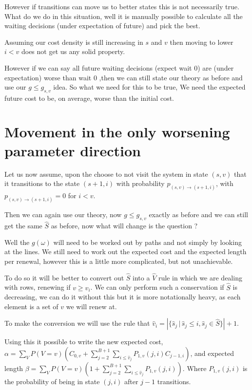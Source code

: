 \documentclass[a4paper,10pt]{article}
\theoremstyle{definition}
\theoremstyle{definition}
\theoremstyle{remark}
\theoremstyle{definition}
\begin{document}
However if transitions can move us to better states this is not necessarily true. What do we do in this situation, well it is manually possible to calculate all the waiting decisions (under expectation of future) and pick the best.

Assuming our cost density is still increasing in $s$ and $v$ then moving to lower $i < v$ does not get us any solid property.

However if we can say all future waiting decisions (expect wait 0) are (under expectation) worse than wait 0 ,then we can still state our theory as before and use our $g \leq g_{s,v}$ idea. So what we need for this to be true, We need the expected future cost to be, on average, worse than the initial cost.

\section{Movement in the only worsening parameter direction}

Let us now assume, upon the choose to not visit the system in state $(s,v)$ that it transitions to the state $(s+1,i)$ with probability $p_{(s,v) \rightarrow (s+1,i)}$, with $p_{(s,v) \rightarrow (s+1,i)}=0$ for $i < v$.

Then we can again use our theory, now $g \leq g_{s,v}$ exactly as before and we can still get the same $\hat{S}$ as before, now what will change is the question ?

Well the $g(\omega)$ will need to be worked out by paths and not simply by looking at the lines. We still need to work out the expected cost and the expected length per renewal, however this is a little more complicated, but not unachievable.

To do so it will be better to convert out $\hat{S}$ into a $\hat{V}$ rule in which we are dealing with rows, renewing if $v \geq \hat{v}_{i}$. We can only perform such a conservation if $\hat{S}$ is decreasing, we can do it without this but it is more notationally heavy, as each element is a set of $v$ we will renew at.

To make the conversion we will use the rule that $\hat{v}_{i}= \left| \{ \hat{s}_{j} \, | \, \hat{s}_{j} \leq i , \hat{s}_{j} \in \hat{S} \}\right|+1$.

Using this it possible to write the new expected cost, $\alpha=\sum\limits_{V} P(V=v) (C_{0,v}+ \sum\limits_{j=2}^{B+1} \sum\limits_{i \leq \hat{v}_{j}} P_{1,v}(j,i) C_{j-1,i})$, and expected length $\beta=\sum\limits_{V} P(V=v) (1+ \sum\limits_{j=2}^{B+1} \sum\limits_{i \leq \hat{v}_{j}} P_{1,v}(j,i))$. Where $P_{1,v}(j,i)$ is the probability of being in state $(j,i)$ after $j-1$ transitions.
\end{document}
